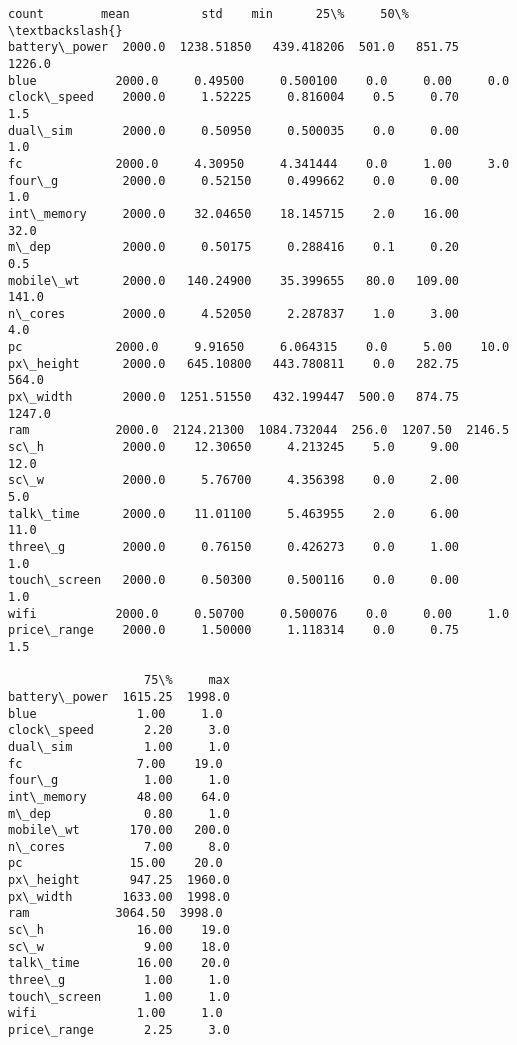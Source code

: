 \documentclass[12pt,a4paper,table]{article}
\makeatletter
\newcommand{\boxspacing}{\kern\kvtcb@left@rule\kern\kvtcb@boxsep}
\newcommand{\prompt}[4]{
        {\ttfamily\llap{{\color{#2}[#3]:\hspace{3pt}#4}}\vspace{-\baselineskip}}
    }
\makeatother
\begin{document}
            \begin{tcolorbox}[breakable, size=fbox, boxrule=.5pt, pad at break*=1mm, opacityfill=0]
\prompt{Out}{outcolor}{4}{\boxspacing}
\begin{Verbatim}[commandchars=\\\{\}]
                count        mean          std    min      25\%     50\%  \textbackslash{}
battery\_power  2000.0  1238.51850   439.418206  501.0   851.75  1226.0
blue           2000.0     0.49500     0.500100    0.0     0.00     0.0
clock\_speed    2000.0     1.52225     0.816004    0.5     0.70     1.5
dual\_sim       2000.0     0.50950     0.500035    0.0     0.00     1.0
fc             2000.0     4.30950     4.341444    0.0     1.00     3.0
four\_g         2000.0     0.52150     0.499662    0.0     0.00     1.0
int\_memory     2000.0    32.04650    18.145715    2.0    16.00    32.0
m\_dep          2000.0     0.50175     0.288416    0.1     0.20     0.5
mobile\_wt      2000.0   140.24900    35.399655   80.0   109.00   141.0
n\_cores        2000.0     4.52050     2.287837    1.0     3.00     4.0
pc             2000.0     9.91650     6.064315    0.0     5.00    10.0
px\_height      2000.0   645.10800   443.780811    0.0   282.75   564.0
px\_width       2000.0  1251.51550   432.199447  500.0   874.75  1247.0
ram            2000.0  2124.21300  1084.732044  256.0  1207.50  2146.5
sc\_h           2000.0    12.30650     4.213245    5.0     9.00    12.0
sc\_w           2000.0     5.76700     4.356398    0.0     2.00     5.0
talk\_time      2000.0    11.01100     5.463955    2.0     6.00    11.0
three\_g        2000.0     0.76150     0.426273    0.0     1.00     1.0
touch\_screen   2000.0     0.50300     0.500116    0.0     0.00     1.0
wifi           2000.0     0.50700     0.500076    0.0     0.00     1.0
price\_range    2000.0     1.50000     1.118314    0.0     0.75     1.5

                   75\%     max
battery\_power  1615.25  1998.0
blue              1.00     1.0
clock\_speed       2.20     3.0
dual\_sim          1.00     1.0
fc                7.00    19.0
four\_g            1.00     1.0
int\_memory       48.00    64.0
m\_dep             0.80     1.0
mobile\_wt       170.00   200.0
n\_cores           7.00     8.0
pc               15.00    20.0
px\_height       947.25  1960.0
px\_width       1633.00  1998.0
ram            3064.50  3998.0
sc\_h             16.00    19.0
sc\_w              9.00    18.0
talk\_time        16.00    20.0
three\_g           1.00     1.0
touch\_screen      1.00     1.0
wifi              1.00     1.0
price\_range       2.25     3.0
\end{Verbatim}
\end{tcolorbox}
        
\end{document}
